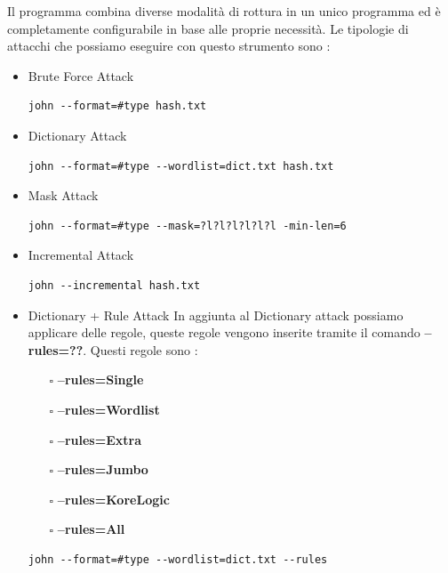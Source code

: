 Il programma combina diverse modalità di rottura in un unico programma ed è completamente configurabile in base alle proprie necessità.
\newpage
Le tipologie di attacchi che possiamo eseguire con questo strumento sono :
\begin{itemize}
    \item Brute Force Attack \newline
          \begin{lstlisting}[caption={John the ripper Brute Force}, style=javaScriptCode]
        john --format=#type hash.txt
    \end{lstlisting}
    \item Dictionary Attack \newline
          \begin{lstlisting}[caption={John the ripper Dictionary}, style=javaScriptCode]
        john --format=#type --wordlist=dict.txt hash.txt
    \end{lstlisting}
    \item Mask Attack \newline
          \begin{lstlisting}[caption={John the ripper Mask}, style=javaScriptCode]
        john --format=#type --mask=?l?l?l?l?l?l -min-len=6
    \end{lstlisting}
    \item Incremental Attack \newline
          \begin{lstlisting}[caption={John the ripper Incremental}, style=javaScriptCode]
        john --incremental hash.txt
    \end{lstlisting}
    \item Dictionary + Rule Attack \newline
          In aggiunta al Dictionary attack possiamo applicare delle regole, queste regole vengono inserite tramite il comando \textbf{--rules=??}.\newline
          Questi regole sono :
          \begin{itemize}
              \item[$\square$] \textbf{--rules=Single}
              \item[$\square$] \textbf{--rules=Wordlist}
              \item[$\square$] \textbf{--rules=Extra}
              \item[$\square$] \textbf{--rules=Jumbo}
              \item[$\square$] \textbf{--rules=KoreLogic}
              \item[$\square$] \textbf{--rules=All}
          \end{itemize}
          \begin{lstlisting}[caption={John the ripper Dictionary + Rule }, style=javaScriptCode]
        john --format=#type --wordlist=dict.txt --rules
    \end{lstlisting}
\end{itemize}

